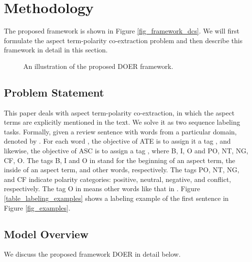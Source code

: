 \documentclass[11pt,a4paper]{article}
\begin{document}
\section{Methodology}
	\label{sec_methodology}
	The proposed framework is shown in Figure \ref{fig_framework_dcs}. We will first formulate the aspect term-polarity co-extraction problem and then describe this framework in detail in this section.
	\begin{figure*}[htbp]
		\centering
		\caption{An illustration of the proposed DOER framework.}\label{fig_framework}
	\end{figure*}

	\subsection{Problem Statement}
	\label{sec_problem}
	This paper deals with aspect term-polarity co-extraction, in which the aspect terms are explicitly mentioned in the text. We solve it as two sequence labeling tasks. Formally, given a review sentence  with  words from a particular domain, denoted by . For each word , the objective of ATE is to assign it a tag , and likewise, the objective of ASC is to assign a tag , where B, I, O and PO, NT, NG, CF, O. The tags B, I and O in  stand for the beginning of an aspect term, the inside of an aspect term, and other words, respectively. The tags PO, NT, NG, and CF indicate polarity categories: positive, neutral, negative, and conflict, respectively. The tag O in  means other words like that in . Figure \ref{table_labeling_examples} shows a labeling example of the first sentence in Figure \ref{fig_examples}.
	
	\subsection{Model Overview}
	\label{sec_model_overview}
	
	We discuss the proposed framework DOER in detail below.
	
\end{document}
